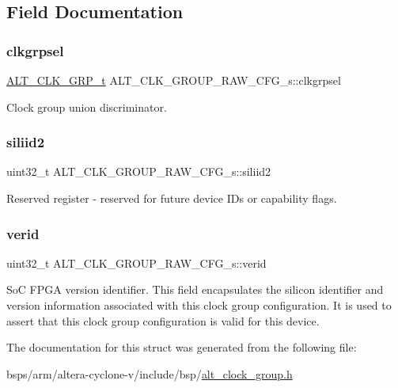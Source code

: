 \subsection{Field Documentation}
\mbox{\label{structALT__CLK__GROUP__RAW__CFG__s_a36d325064c461d62802b3bd81d112b15}} 
\subsubsection{\texorpdfstring{clkgrpsel}{clkgrpsel}}
{\footnotesize\ttfamily \mbox{\hyperlink{alt__clock__group_8h_a077fbf1185c79377d6bdfe47a56713eb}{A\+L\+T\+\_\+\+C\+L\+K\+\_\+\+G\+R\+P\+\_\+t}} A\+L\+T\+\_\+\+C\+L\+K\+\_\+\+G\+R\+O\+U\+P\+\_\+\+R\+A\+W\+\_\+\+C\+F\+G\+\_\+s\+::clkgrpsel}

Clock group union discriminator. \mbox{\label{structALT__CLK__GROUP__RAW__CFG__s_aaa72aaa775be4dd6925078d5e819f712}} 
\subsubsection{\texorpdfstring{siliid2}{siliid2}}
{\footnotesize\ttfamily uint32\+\_\+t A\+L\+T\+\_\+\+C\+L\+K\+\_\+\+G\+R\+O\+U\+P\+\_\+\+R\+A\+W\+\_\+\+C\+F\+G\+\_\+s\+::siliid2}

Reserved register -\/ reserved for future device I\+Ds or capability flags. \mbox{\label{structALT__CLK__GROUP__RAW__CFG__s_ac85dda3c83196863d0c83aca2f6ff2fb}} 
\subsubsection{\texorpdfstring{verid}{verid}}
{\footnotesize\ttfamily uint32\+\_\+t A\+L\+T\+\_\+\+C\+L\+K\+\_\+\+G\+R\+O\+U\+P\+\_\+\+R\+A\+W\+\_\+\+C\+F\+G\+\_\+s\+::verid}

SoC F\+P\+GA version identifier. This field encapsulates the silicon identifier and version information associated with this clock group configuration. It is used to assert that this clock group configuration is valid for this device. 

The documentation for this struct was generated from the following file\+:\begin{DoxyCompactItemize}
\item 
bsps/arm/altera-\/cyclone-\/v/include/bsp/\mbox{\hyperlink{alt__clock__group_8h}{alt\+\_\+clock\+\_\+group.\+h}}\end{DoxyCompactItemize}
